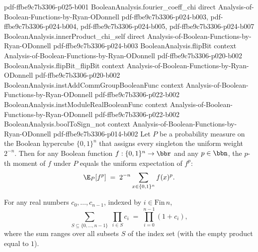 \begin{lemma}
{    pdf-ffbe9c7b3306-p025-b001}
\proofstep
  {BooleanAnalysis.fourier_coeff_chi}
  {direct}
  {Analysis-of-Boolean-Functions-by-Ryan-ODonnell}
  {pdf-ffbe9c7b3306-p024-b003,
    pdf-ffbe9c7b3306-p024-b004,
    pdf-ffbe9c7b3306-p024-b005,
    pdf-ffbe9c7b3306-p024-b007}
\proofstep
  {BooleanAnalysis.innerProduct_chi_self}
  {direct}
  {Analysis-of-Boolean-Functions-by-Ryan-ODonnell}
  {pdf-ffbe9c7b3306-p024-b003}
\proofstep
  {BooleanAnalysis.flipBit}
  {context}
  {Analysis-of-Boolean-Functions-by-Ryan-ODonnell}
  {pdf-ffbe9c7b3306-p020-b002}
\proofstep
  {BooleanAnalysis.flipBit_flipBit}
  {context}
  {Analysis-of-Boolean-Functions-by-Ryan-ODonnell}
  {pdf-ffbe9c7b3306-p020-b002}
\proofstep
  {BooleanAnalysis.instAddCommGroupBooleanFunc}
  {context}
  {Analysis-of-Boolean-Functions-by-Ryan-ODonnell}
  {pdf-ffbe9c7b3306-p022-b002}
\proofstep
  {BooleanAnalysis.instModuleRealBooleanFunc}
  {context}
  {Analysis-of-Boolean-Functions-by-Ryan-ODonnell}
  {pdf-ffbe9c7b3306-p022-b002}
\proofstep
  {BooleanAnalysis.boolToSign_not}
  {context}
  {Analysis-of-Boolean-Functions-by-Ryan-ODonnell}
  {pdf-ffbe9c7b3306-p014-b002}
Let $P$ be a probability measure on the Boolean hypercube $\{0,1\}^n$ that assigns every
singleton the uniform weight $2^{-n}$. Then for any Boolean function $f : \{0,1\}^n \to
\bbr$ and any $p \in \bbn$, the $p$-th moment of $f$ under $P$ equals the uniform
expectation of $f^p$:
\[
  \E_P\!\left[f^p\right] \;=\; 2^{-n}\sum_{x\in\{0,1\}^n} f(x)^p.
\]
\end{lemma}

\begin{lemma}
\label{BooleanAnalysis.sum_prod_subset_eq_prod_one_add}
\leanok
{}
For any real numbers $c_0,\dots,c_{n-1}$, indexed by $i \in \mathrm{Fin}\,n$,
\[
\sum_{S \subseteq \{0,\dots,n-1\}} \; \prod_{i \in S} c_i \;=\; \prod_{i=0}^{n-1} (1 +
c_i),
\]
where the sum ranges over all subsets $S$ of the index set (with the empty product equal
to $1$).
\end{lemma}

